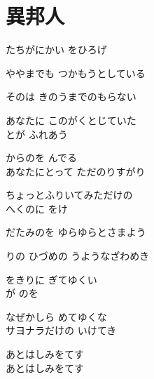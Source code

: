 \section{ 異邦人}
\large{

たちがにかい をひろげ

ややまでも つかもうとしている

そのは きのうまでのもらない

あなたに このがくとじていた
\\

とが ふれあう

からのを んでる
\\

あなたにとって ただのりすがり

ちょっとふりいてみただけの 
\\

へくのに をけ

だたみのを ゆらゆらとさまよう

りの ひづめの うようなざわめき

をきりに ぎてゆくい
\\

が のを

なぜかしら めてゆくな
\\

サヨナラだけの いけてき

あとはしみをてす 
\\

あとはしみをてす 

}